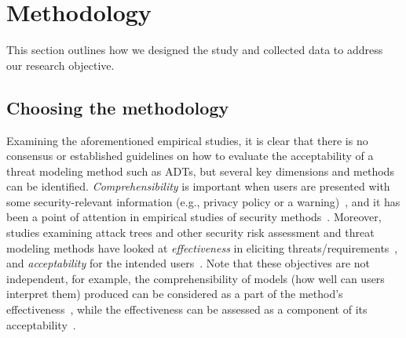 \section{Methodology}\label{sec:methodology}

This section outlines how we designed the study and collected data to address our research objective.

\subsection{Choosing the methodology}\label{sec:choosing_method}
Examining the aforementioned empirical studies, it is clear that there is no consensus or established guidelines on how to evaluate the acceptability of a threat modeling method such as ADTs, but several key dimensions and methods can be identified. \emph{Comprehensibility} is important when users are presented with some security-relevant information (e.g., privacy policy or a warning)~\cite{wu_what_2020,chen2023investigating}, and it has been a point of attention in empirical studies of security methods~\cite{hogganvik_risk_2005,lallieEmpiricalEvaluationEffectiveness2017}. Moreover, studies examining attack trees and other security risk assessment and threat modeling methods have looked at \emph{effectiveness} in eliciting threats/requirements~\cite{opdahlExperimentalComparisonAttack2009,tuma2018two,labunets2017model}, and \emph{acceptability} for the intended users~\cite{tondel2019understanding,broccia_assessing_2024,broccia2025evaluating}. Note that these objectives are not independent, for example, the comprehensibility of models (how well can users interpret them) produced can be considered as a part of the method's effectiveness~\cite{abrahao2011evaluating,labunets2017model,kattaComparingTwoTechniques2010}, while the effectiveness can be assessed as a component of its acceptability~\cite{broccia_assessing_2024,labunetsFirstEmpiricalEvaluation2014a,stevens2018battle,broccia2025evaluating}.


